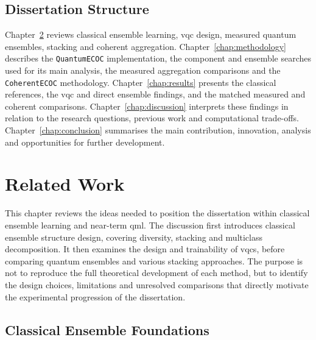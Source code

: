\documentclass[]{UCD_CS_MSc_AAI_Report}
\begin{document}

\section{Dissertation Structure}
\label{sec:intro-structure}

Chapter~\ref{chap:related-work} reviews classical ensemble learning, \ac{vqc} design, measured quantum ensembles, stacking and coherent aggregation. Chapter~\ref{chap:methodology} describes the \texttt{QuantumECOC} implementation, the component and ensemble searches used for its main analysis, the measured aggregation comparisons and the \texttt{CoherentECOC} methodology. Chapter~\ref{chap:results} presents the classical references, the \ac{vqc} and direct ensemble findings, and the matched measured and coherent comparisons. Chapter~\ref{chap:discussion} interprets these findings in relation to the research questions, previous work and computational trade-offs. Chapter~\ref{chap:conclusion} summarises the main contribution, innovation, analysis and opportunities for further development.




\chapter{Related Work}
\label{chap:related-work}

This chapter reviews the ideas needed to position the dissertation within classical ensemble learning and near-term \ac{qml}. The discussion first introduces classical ensemble structure design, covering diversity, stacking and multiclass decomposition. It then examines the design and trainability of \acp{vqc}, before comparing quantum ensembles and various stacking approaches. The purpose is not to reproduce the full theoretical development of each method, but to identify the design choices, limitations and unresolved comparisons that directly motivate the experimental progression of the dissertation.

\section{Classical Ensemble Foundations}
\label{sec:rw-classical-ensembles}
\end{document}
